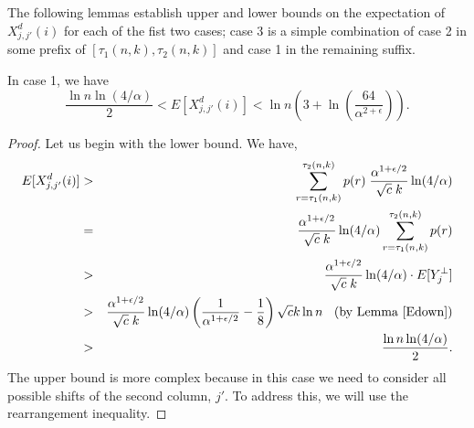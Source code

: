 \documentclass[11pt]{article}
\begin{document}
The following lemmas establish upper and lower bounds on the expectation of $X^d_{j,j'}(i)$ 
{for each of the fist two cases; case 3 is a simple combination of case 2 in some prefix of $[\tau_1(n,k),\tau_2(n,k)]$ and case 1 in the remaining suffix.}

\begin{lemma}\label{case1}
    In case 1, we have
    \[
    \frac{\ln n \ln({4}/{\alpha})}{2} 
    < E[X^d_{j,j'}(i)] <
    \ln n \left( 3 + \ln\left(\frac{64}{\alpha^{2 +\epsilon }}  \right) \right).
    \]
\end{lemma}
\begin{proof}
Let us begin with the lower bound. We have,
\begin{eqnarray*}
   E[X^d_{j,j'}(i)] 
          & > & \sum_{r= \tau_1(n,k) }^{\tau_2(n,k)} p(r)\; \frac{\alpha^{1+\epsilon/2} }{\sqrt{c}\; k}\ln({4}/{\alpha})  \\
          & = & \frac{\alpha^{1+\epsilon/2} }{\sqrt{c}\; k}\ln({4}/{\alpha}) \sum_{r= \tau_1(n,k) }^{\tau_2(n,k)} p(r)  \\
          & > & \frac{\alpha^{1+\epsilon/2} }{\sqrt{c}\; k}\ln({4}/{\alpha})  \cdot E[Y^{\perp}_j]   \\           
          & > & \frac{\alpha^{1+\epsilon/2} }{\sqrt{c}\; k}\ln({4}/{\alpha})  
                 \left (\frac{1}{\alpha^{1 + \epsilon/2}} - \frac{1}{8} \right )\sqrt{c} k \ln n 
          \;\; \text{ (by Lemma \ref{Edown})}\\
          & > & \frac{ \ln n \ln({4}/{\alpha})}{2 }.
\end{eqnarray*} 
The upper bound is more complex because in this case we need to consider all possible shifts of the second 
column, $j'$. To address this, we will use the rearrangement inequality.


\end{proof}
\end{document}
